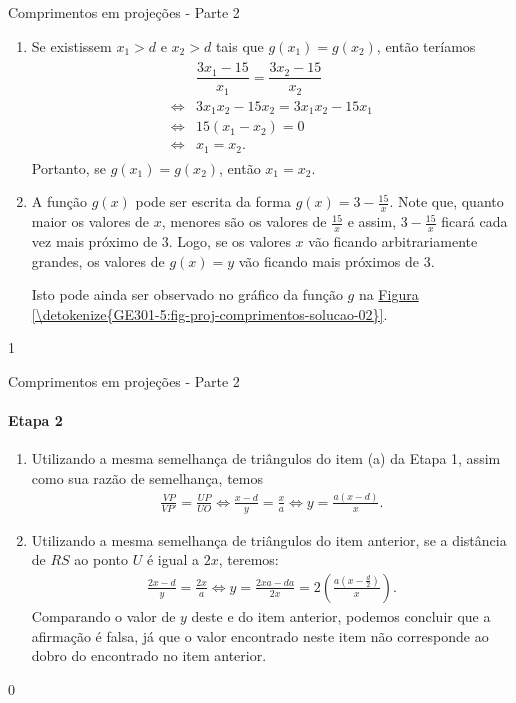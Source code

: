 \begin{answer}{Comprimentos em projeções - Parte 2}
{\begin{enumerate}
\item {} 
Se existissem \(x_1>d\) e \(x_2>d\) tais que \(g(x_1)=g(x_2)\), então teríamos
\begin{equation*}
\begin{split}\begin{array}{ll}
& \dfrac{3x_1-15}{x_1} = \dfrac{3x_2-15}{x_2} \\
\Longleftrightarrow & 3x_1x_2-15x_2 = 3x_1x_2-15x_1 \\
\Longleftrightarrow & 15(x_1 - x_2)=0 \\
\Longleftrightarrow & x_1 = x_2.
\end{array}\end{split}
\end{equation*}
Portanto, se \(g(x_1)=g(x_2)\), então \(x_1 = x_2\).

\item {} 
A função \(g(x)\) pode ser escrita da forma \(g(x)=3-\frac{15}{x}\). Note que, quanto maior os valores de \(x\), menores são os valores de \(\frac{15}{x}\) e assim, \(3-\frac{15}{x}\) ficará cada vez mais próximo de \(3\). Logo, se os valores \(x\) vão ficando arbitrariamente grandes, os valores de \(g(x)=y\) vão ficando mais próximos de \(3\).

Isto pode ainda ser observado no gráfico da função \(g\) na \hyperref[\detokenize{GE301-5:fig-proj-comprimentos-solucao-02}]{Figura \ref{\detokenize{GE301-5:fig-proj-comprimentos-solucao-02}}}.
\end{enumerate}
}{1}
\end{answer}
\begin{answer}{Comprimentos em projeções - Parte 2}
{
\paragraph{Etapa 2}
\begin{enumerate}
\item {} 
Utilizando a mesma semelhança de triângulos do item (a) da Etapa 1, assim como sua razão de semelhança, temos
\begin{equation*}
\begin{split}\frac{VP}{VP'}=\frac{UP}{UO} \Longleftrightarrow \frac{x-d}{y}=\frac{x}{a} \Longleftrightarrow y=\frac{a(x-d)}{x}.\end{split}
\end{equation*}
\item {} 
Utilizando a mesma semelhança de triângulos do item anterior, se a distância de \(RS\) ao ponto \(U\) é igual a \(2x\), teremos:
\begin{equation*}
\begin{split}\frac{2x-d}{y}=\frac{2x}{a} \Longleftrightarrow y=\frac{2xa-da}{2x}=2\left(\frac{a(x-\frac{d}{2})}{x}\right).\end{split}
\end{equation*}
Comparando o valor de \(y\) deste e do item anterior, podemos concluir que a afirmação é falsa, já que o valor encontrado neste item não corresponde ao dobro do encontrado no item anterior.

\end{enumerate}
}{0}
\end{answer}
